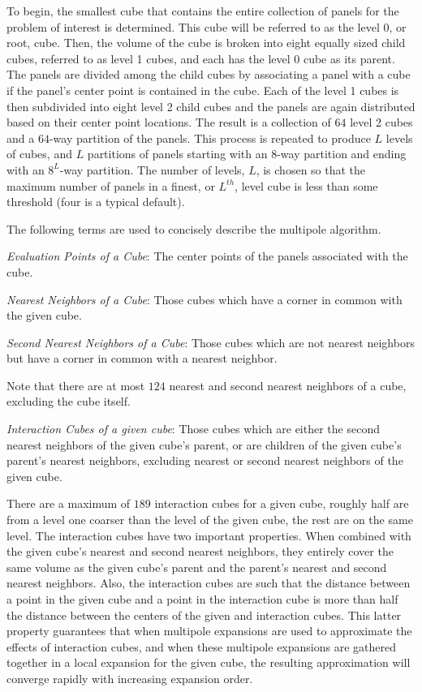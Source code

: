 To begin, the smallest cube that contains the entire collection of panels
for the problem of interest is determined.  This cube will be referred to
as the level 0, or root, cube. Then, the volume of the cube is broken into
eight equally sized child cubes, referred to as level 1 cubes, and each has
the level 0 cube as its parent. The panels are divided among the child cubes
by associating a panel with a cube if the panel's center point is contained
in the cube.  Each of the level 1 cubes is then subdivided into eight level
2 child cubes and the panels are again distributed based on their center
point locations. The result is a collection of $ 64 $ level 2 cubes and a $
64 $-way partition of the panels.  This process is repeated to produce $ L $
levels of cubes, and $ L $ partitions of panels starting with an $8$-way
partition and ending with an $ 8^L $-way partition.  The number of levels,
$ L $, is chosen so that the maximum number of panels in a finest, or
$L^{th} $, level cube is less than some threshold (four is a typical
default).

The following terms are used to concisely describe the multipole algorithm.
\begin{Definition}
{\it Evaluation Points of a Cube}: The center points of the panels associated
with the cube.
\end{Definition}
\begin{Definition}
{\it Nearest Neighbors of a Cube}: Those cubes which have a corner in
common with the given cube.
\end{Definition}
\begin{Definition}
{\it Second Nearest Neighbors of a Cube}: Those cubes which are not
nearest neighbors but have a corner in common with a nearest neighbor.
\end{Definition}
Note that there are at most $ 124 $ nearest and second nearest neighbors 
of a cube, excluding the cube itself. 

\begin{Definition}
{\it Interaction Cubes of a given cube}: Those cubes which are either
the second nearest neighbors of the given cube's parent, or are
children of the given cube's parent's nearest neighbors, excluding
nearest or second nearest neighbors of the given cube.
\end{Definition}
There are a maximum of $ 189 $ interaction cubes for a given cube,
roughly half are from a level one coarser than the level of the given
cube, the rest are on the same level.  The interaction cubes have two
important properties. When combined with the given cube's nearest and
second nearest neighbors, they entirely cover the same volume as the
given cube's parent and the parent's nearest and second nearest
neighbors. Also, the interaction cubes are such that the distance
between a point in the given cube and a point in the interaction cube
is more than half the distance between the centers of the given and
interaction cubes.  This latter property guarantees that when
multipole expansions are used to approximate the effects of
interaction cubes, and when these multipole expansions are gathered
together in a local expansion for the given cube, the resulting
approximation will converge rapidly with increasing expansion order.

